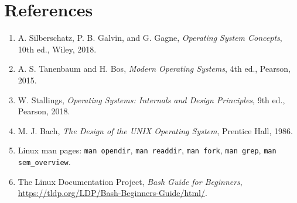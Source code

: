 \documentclass[12pt,a4paper]{article}
\begin{document}


\newpage


\newpage


\newpage


\newpage


\newpage


\newpage


\newpage


\newpage
\section*{References}
\sloppy
\begin{enumerate}
    \item A. Silberschatz, P. B. Galvin, and G. Gagne, \textit{Operating System Concepts}, 10th ed., Wiley, 2018.
    \item A. S. Tanenbaum and H. Bos, \textit{Modern Operating Systems}, 4th ed., Pearson, 2015.
    \item W. Stallings, \textit{Operating Systems: Internals and Design Principles}, 9th ed., Pearson, 2018.
    \item M. J. Bach, \textit{The Design of the UNIX Operating System}, Prentice Hall, 1986.
    \item Linux man pages: \texttt{man opendir}, \texttt{man readdir}, \texttt{man fork}, \texttt{man grep}, \texttt{man sem\_overview}.
    \item The Linux Documentation Project, \textit{Bash Guide for Beginners}, \url{https://tldp.org/LDP/Bash-Beginners-Guide/html/}.
\end{enumerate}
\end{document}

